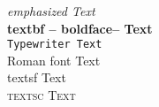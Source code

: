 \documentclass{article}  %
\begin{document}
 
 
\emph {emphasized Text }\\
\textbf {textbf -- boldface-- Text }\\
\texttt {Typewriter Text }\\
\textrm {Roman font Text }\\
\textsf {textsf Text }\\
\textsc {textsc Text }\\
\end{document}
